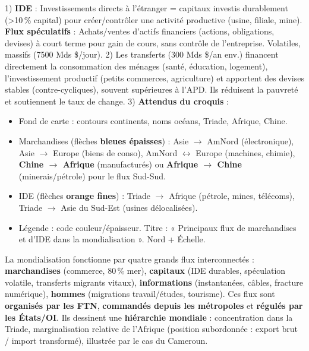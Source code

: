 \documentclass[11pt]{article}
\begin{document}
\begin{corrige}[Exercice 1 à 3]
1) \textbf{IDE} : Investissements directs à l'étranger = capitaux investis durablement (\textgreater 10\,\% capital) pour créer/contrôler une activité productive (usine, filiale, mine). \textbf{Flux spéculatifs} : Achats/ventes d'actifs financiers (actions, obligations, devises) à court terme pour gain de cours, sans contrôle de l'entreprise. Volatiles, massifs (7500 Mds \$/jour).
2) Les transferts (300 Mds \$/an env.) financent directement la consommation des ménages (santé, éducation, logement), l'investissement productif (petits commerces, agriculture) et apportent des devises stables (contre-cycliques), souvent supérieures à l'APD. Ils réduisent la pauvreté et soutiennent le taux de change.
3) \textbf{Attendus du croquis} : 
\begin{itemize}
\item Fond de carte : contours continents, noms océans, Triade, Afrique, Chine.
\item Marchandises (flèches \textbf{bleues épaisses}) : Asie $\rightarrow$ AmNord (électronique), Asie $\rightarrow$ Europe (biens de conso), AmNord $\leftrightarrow$ Europe (machines, chimie), \textbf{Chine $\rightarrow$ Afrique} (manufacturés) ou \textbf{Afrique $\rightarrow$ Chine} (minerais/pétrole) pour le flux Sud-Sud.
\item IDE (flèches \textbf{orange fines}) : Triade $\rightarrow$ Afrique (pétrole, mines, télécoms), Triade $\rightarrow$ Asie du Sud-Est (usines délocalisées).
\item Légende : code couleur/épaisseur. Titre : « Principaux flux de marchandises et d'IDE dans la mondialisation ». Nord + Échelle.
\end{itemize}
\end{corrige}

\begin{aretenir}
La mondialisation fonctionne par quatre grands flux interconnectés : \textbf{marchandises} (commerce, 80\,\% mer), \textbf{capitaux} (IDE durables, spéculation volatile, transferts migrants vitaux), \textbf{informations} (instantanées, câbles, fracture numérique), \textbf{hommes} (migrations travail/études, tourisme). Ces flux sont \textbf{organisés par les FTN}, \textbf{commandés depuis les métropoles} et \textbf{régulés par les États/OI}. Ils dessinent une \textbf{hiérarchie mondiale} : concentration dans la Triade, marginalisation relative de l'Afrique (position subordonnée : export brut / import transformé), illustrée par le cas du Cameroun.
\end{aretenir}
\end{document}
